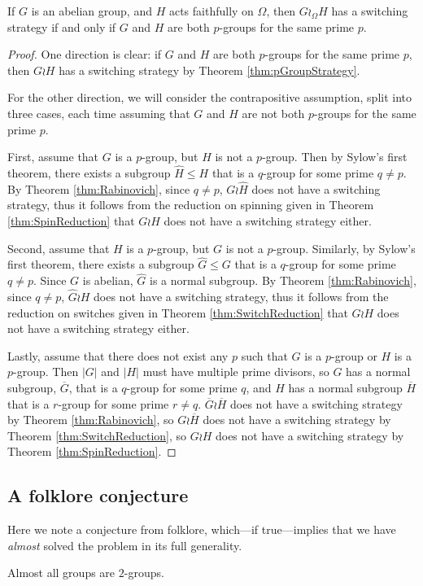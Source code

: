\begin{theorem}
  If $G$ is an abelian group, and $H$ acts faithfully on $\Omega$, then
  $G \wr_\Omega H$ has a switching strategy if and only if $G$ and $H$ are
  both $p$-groups for the same prime $p$.
\label{thm:classifyAbelianSwitches}
\end{theorem}
\begin{proof}
  One direction is clear: if $G$ and $H$ are both $p$-groups for the same prime
  $p$, then $G \wr H$ has a switching strategy by Theorem \ref{thm:pGroupStrategy}.

  For the other direction, we will consider the contrapositive assumption,
  split into three cases, each time assuming that
  $G$ and $H$ are not both $p$-groups for the same prime $p$.

  First, assume that $G$ is a $p$-group, but $H$ is not a $p$-group. Then by
  Sylow's first theorem, there exists a subgroup $\hat{H} \leq H$ that is a $q$-group
  for some prime $q \neq p$. By Theorem \ref{thm:Rabinovich}, since $q \neq p$,
  $G \wr \hat{H}$ does not have a switching strategy, thus it follows from
  the reduction on spinning given in Theorem \ref{thm:SpinReduction} that
  $G \wr H$ does not have a switching strategy either.

  Second, assume that $H$ is a $p$-group, but $G$ is not a $p$-group. Similarly,
  by Sylow's first theorem, there exists a subgroup $\hat{G} \leq G$ that is
  a $q$-group for some prime $q \neq p$. Since $G$ is abelian, $\hat{G}$ is a
  normal subgroup. By Theorem \ref{thm:Rabinovich}, since $q \neq p$,
  $\hat G \wr H$ does not have a switching strategy, thus it follows from
  the reduction on switches given in Theorem \ref{thm:SwitchReduction} that
  $G \wr H$ does not have a switching strategy either.

  Lastly, assume that there does not exist any $p$ such that $G$ is a $p$-group
  or $H$ is a $p$-group. Then $|G|$ and $|H|$ must have multiple prime divisors,
  so $G$ has a normal subgroup, $\overline G$, that is a $q$-group for some prime $q$, and
  $H$ has a normal subgroup $\overline H$ that is a $r$-group for some prime $r \neq q$.
  $\overline G \wr \overline H$ does not have a switching strategy by Theorem \ref{thm:Rabinovich},
  so $G \wr \overline H$ does not have a switching strategy by Theorem \ref{thm:SwitchReduction},
  so $G \wr H$ does not have a switching strategy by Theorem \ref{thm:SpinReduction}.
\end{proof}

\subsection{A folklore conjecture}
Here we note a conjecture from folklore, which---if true---implies that we have
\textit{almost} solved the problem in its full generality.
\begin{conjecture}[Folklore]
  Almost all groups are $2$-groups.
\end{conjecture}

